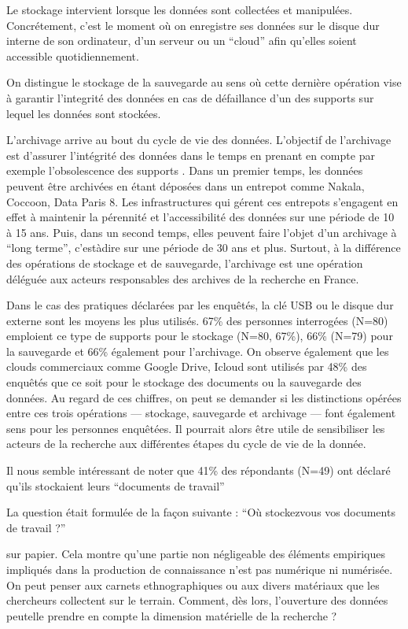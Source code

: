 \documentclass[letterpaper,10pt,english]{jupyterBook}
\begin{document}
\sphinxAtStartPar
Le stockage intervient lorsque les données sont collectées et manipulées. Concrétement, c’est le moment où on enregistre ses données sur le disque dur interne de son ordinateur, d’un serveur ou un “cloud” afin qu’elles soient accessible quotidiennement.

\sphinxAtStartPar
On distingue le stockage de la sauvegarde au sens où cette dernière opération vise à garantir l’integrité des données en cas de défaillance d’un des supports sur lequel les données sont stockées.

\sphinxAtStartPar
L’archivage arrive au bout du cycle de vie des données. L’objectif de l’archivage est d’assurer l’intégrité des données dans le temps en prenant en compte par exemple l’obsolescence des supports . Dans un premier temps, les données peuvent être archivées en étant déposées dans un entrepot comme Nakala, Coccoon, Data Paris 8. Les infrastructures qui gérent ces entrepots s’engagent en effet à maintenir la pérennité et l’accessibilité des données sur une période de 10 à 15 ans. Puis, dans un second temps, elles peuvent faire l’objet d’un archivage à “long terme”, c’est\sphinxhyphen{}à\sphinxhyphen{}dire sur une période de 30 ans et plus. Surtout, à la différence des opérations de stockage et de sauvegarde, l’archivage est une opération déléguée aux acteurs responsables des archives de la recherche en France.

\sphinxAtStartPar
Dans le cas des pratiques déclarées par les enquêtés, la clé USB ou le disque dur externe sont les moyens les plus utilisés. 67\% des personnes interrogées (N=80) emploient ce type de supports pour le stockage (N=80, 67\%), 66\% (N=79) pour la sauvegarde et 66\% également pour l’archivage. On observe également que les clouds commerciaux comme Google Drive, Icloud sont utilisés par 48\% des enquêtés que ce soit pour le stockage des documents ou la sauvegarde des données. Au regard de ces chiffres, on peut se demander si les distinctions opérées entre ces trois opérations — stockage, sauvegarde et archivage — font également sens pour les personnes enquêtées. Il pourrait alors être utile de sensibiliser les acteurs de la recherche aux différentes étapes du cycle de vie de la donnée.

\sphinxAtStartPar
Il nous semble intéressant de noter que 41\% des répondants (N=49) ont déclaré qu’ils stockaient leurs “documents de travail”%
\begin{footnote}[3]\sphinxAtStartFootnote
La question était formulée de la façon suivante : “Où stockez\sphinxhyphen{}vous vos documents de travail ?”
%
\end{footnote} sur papier. Cela montre qu’une partie non négligeable des éléments empiriques impliqués dans la production de connaissance n’est pas numérique ni numérisée. On peut penser aux carnets ethnographiques ou aux divers matériaux que les chercheurs collectent sur le terrain. Comment, dès lors, l’ouverture des données peut\sphinxhyphen{}elle prendre en compte la dimension matérielle de la recherche ?
\end{document}
